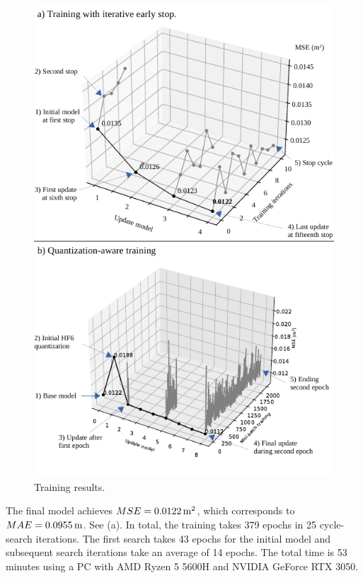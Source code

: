 \begin{figure}[h!]
	\centering
	\includegraphics[width=\columnwidth]{../figures/histograms/training_and_quantization.pdf}
	\caption{Training results.}
	\label{fig:optimization}
\end{figure}

The final model achieves $MSE=\unit[0.0122]{m^2}$, which corresponds to $MAE=\unit[0.0955]{m}$. See (a). In total, the training takes 379 epochs in 25 cycle-search iterations. The first search takes 43 epochs for the initial model and subsequent search iterations take an average of 14 epochs. The total time is 53 minutes using a PC with AMD Ryzen 5 5600H and NVIDIA GeForce RTX 3050.


